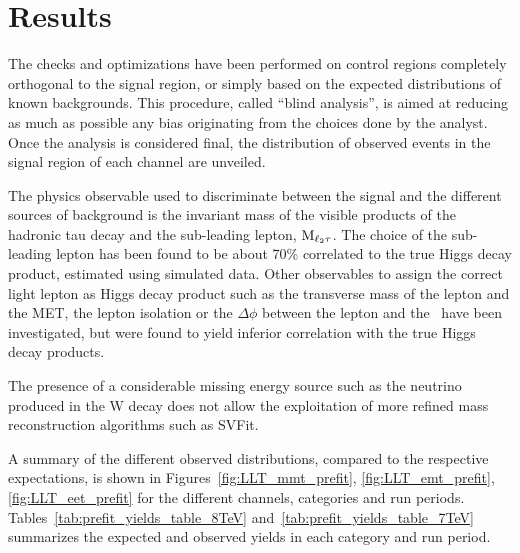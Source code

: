\section{Results}

The checks and optimizations have been performed on control regions completely orthogonal to the signal region, or simply based on the expected distributions of known backgrounds. This procedure, called ``blind analysis'', is aimed at reducing as much as possible any bias originating from the choices done by the analyst. 
Once the analysis is considered final, the distribution of observed events in the signal region of each channel are unveiled. 

The physics observable used to discriminate between the signal and the different sources of background is the invariant mass of the visible products of the hadronic tau decay and the sub-leading lepton, $\rm{M}_{\ell_2 \tau}$. The choice of the sub-leading lepton has been found to be about 70\% correlated to the true Higgs decay product, estimated using simulated data. Other observables to assign the correct light lepton as Higgs decay product such as the transverse mass of the lepton and the MET, the lepton isolation or the $\Delta\phi$ between the lepton and the \MET\ have been investigated, but were found to yield inferior correlation with the true Higgs decay products.

The presence of a considerable missing energy source such as the neutrino produced in the W decay does not allow the exploitation of more refined mass reconstruction algorithms such as SVFit.

A summary of the different observed distributions, compared to the respective expectations, is shown in Figures~\ref{fig:LLT_mmt_prefit}, \ref{fig:LLT_emt_prefit}, \ref{fig:LLT_eet_prefit} for the different channels, categories and run periods. Tables~\ref{tab:prefit_yields_table_8TeV} and~\ref{tab:prefit_yields_table_7TeV} summarizes the expected and observed yields in each category and run period.

